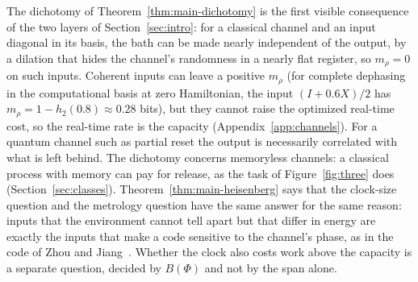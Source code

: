 The dichotomy of Theorem~\ref{thm:main-dichotomy} is the first visible consequence of the two layers of Section~\ref{sec:intro}: for a classical channel and an input diagonal in its basis, the bath can be made nearly independent of the output, by a dilation that hides the channel's randomness in a nearly flat register, so $m_\rho=0$ on such inputs. Coherent inputs can leave a positive $m_\rho$ (for complete dephasing in the computational basis at zero Hamiltonian, the input $(I+0.6X)/2$ has $m_\rho=1-h_2(0.8)\approx0.28$ bits), but they cannot raise the optimized real-time cost, so the real-time rate is the capacity (Appendix~\ref{app:channels}). For a quantum channel such as partial reset the output is necessarily correlated with what is left behind. The dichotomy concerns memoryless channels: a classical process with memory can pay for release, as the task of Figure~\ref{fig:three} does (Section~\ref{sec:classes}). Theorem~\ref{thm:main-heisenberg} says that the clock-size question and the metrology question have the same answer for the same reason: inputs that the environment cannot tell apart but that differ in energy are exactly the inputs that make a code sensitive to the channel's phase, as in the code of Zhou and Jiang~\cite[Sec.~V]{ZhouJiang21}. Whether the clock also costs work above the capacity is a separate question, decided by $B(\Phi)$ and not by the span alone.

